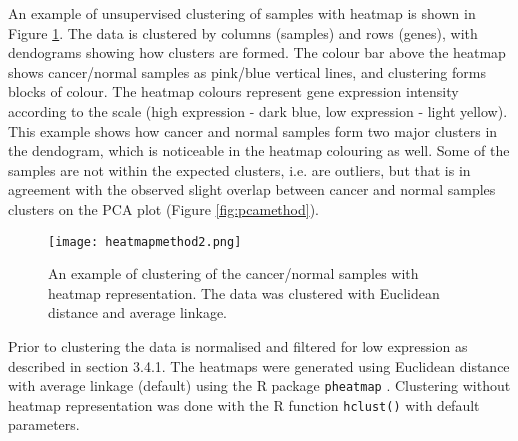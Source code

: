     

   An example of unsupervised clustering of samples with heatmap is shown in Figure \ref{fig:heatmapmethod}. The data is clustered by columns (samples) and rows (genes), with dendograms showing how clusters are formed. The colour bar above the heatmap shows cancer/normal samples as pink/blue vertical lines, and clustering forms blocks of colour. The heatmap colours  represent gene expression intensity according to the scale (high expression - dark blue, low expression - light yellow). 
   This example shows how cancer and normal samples form two major clusters in the dendogram, which is noticeable in the heatmap colouring as well. Some of the samples are not within the expected clusters, i.e. are outliers, but that is in agreement with the observed  slight overlap between cancer and normal samples clusters on the PCA plot (Figure \ref{fig:pcamethod}).

        \begin{figure}[h]
        \centering
        \texttt{[image: heatmapmethod2.png]}
        \caption[Clustering with heatmap example]{An example of clustering of the cancer/normal samples with heatmap representation. The data was clustered with Euclidean distance and average linkage. }
        \label{fig:heatmapmethod}
        \end{figure}
    
    Prior to clustering the data is normalised and filtered for low expression as described in section 3.4.1. The heatmaps were generated using Euclidean distance with average linkage (default) using the R package  \texttt{pheatmap} \cite{kolde2012pheatmap}. Clustering without heatmap representation was done with the R function \texttt{hclust()} with default parameters.


   



 
